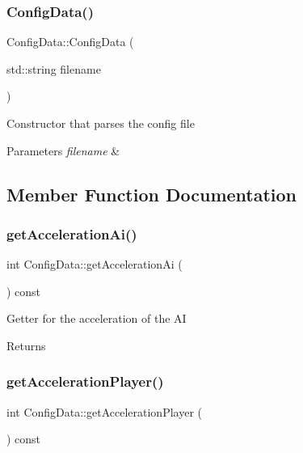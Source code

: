 \subsubsection{\texorpdfstring{Config\+Data()}{ConfigData()}}
{\footnotesize\ttfamily Config\+Data\+::\+Config\+Data (\begin{DoxyParamCaption}\item[{std\+::string}]{filename }\end{DoxyParamCaption})}

Constructor that parses the config file 
\begin{DoxyParams}{Parameters}
{\em filename} & \\
\hline
\end{DoxyParams}


\subsection{Member Function Documentation}
\mbox{\label{classConfigData_a8ac967cae90e657e68fbd0d1e163f0ec}} 
\subsubsection{\texorpdfstring{get\+Acceleration\+Ai()}{getAccelerationAi()}}
{\footnotesize\ttfamily int Config\+Data\+::get\+Acceleration\+Ai (\begin{DoxyParamCaption}{ }\end{DoxyParamCaption}) const}

Getter for the acceleration of the AI \begin{DoxyReturn}{Returns}

\end{DoxyReturn}
\mbox{\label{classConfigData_a7889ad0ddf98c026ef9996a8d09f7337}} 
\subsubsection{\texorpdfstring{get\+Acceleration\+Player()}{getAccelerationPlayer()}}
{\footnotesize\ttfamily int Config\+Data\+::get\+Acceleration\+Player (\begin{DoxyParamCaption}{ }\end{DoxyParamCaption}) const}


